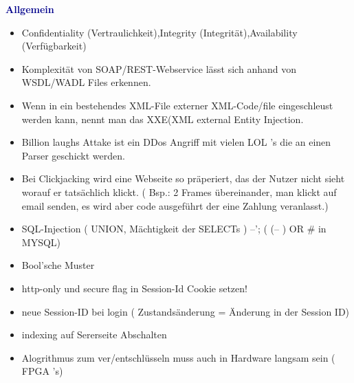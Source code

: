 \textbf{\textcolor{darkblue}{ Allgemein}}~
	\begin{itemize}
		
	\item Confidentiality (Vertraulichkeit),Integrity (Integrität),Availability (Verfügbarkeit)
	\item Komplexität von SOAP/REST-Webservice lässt sich anhand von WSDL/WADL Files erkennen.
	\item Wenn in ein bestehendes XML-File externer XML-Code/file eingeschleust werden kann, nennt man das XXE(XML external Entity Injection.
	\item Billion laughs Attake ist ein DDos Angriff mit vielen LOL \'{ '}s die an einen Parser geschickt werden.
	\item Bei Clickjacking wird eine Webseite so präperiert, das der Nutzer nicht sieht worauf er tatsächlich klickt. ( Bsp.: 2 Frames übereinander, man klickt auf email senden, es wird aber code ausgeführt der eine Zahlung veranlasst.)
	\item SQL-Injection ( UNION, Mächtigkeit der SELECTs ) --'; ( (-- ) OR \# in MYSQL)
	\item Bool'sche Muster
	\item http-only und secure flag in Session-Id Cookie setzen!
	\item  neue Session-ID bei login ( Zustandsänderung = Änderung in der Session ID)
	\item  indexing auf Sererseite Abschalten
	\item Alogrithmus zum ver/entschlüsseln muss auch in Hardware langsam sein ( FPGA\'{ '}s)
	
	\end{itemize}















